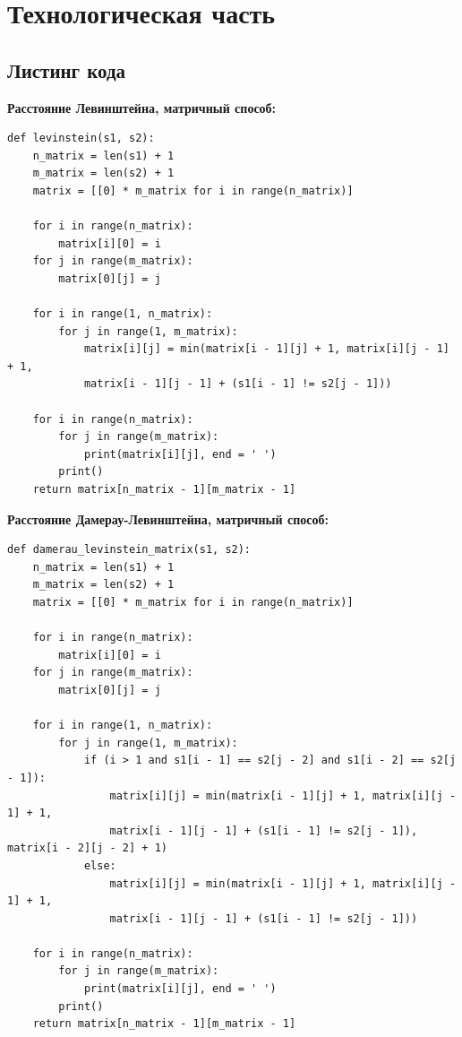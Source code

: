 \documentclass[a4paper,14pt]{report} %
\begin{document}
\chapter{Технологическая часть}
\section{Листинг кода}

\textbf{Расстояние Левинштейна, матричный способ: }
\begin{lstlisting}
def levinstein(s1, s2):
    n_matrix = len(s1) + 1
    m_matrix = len(s2) + 1
    matrix = [[0] * m_matrix for i in range(n_matrix)]

    for i in range(n_matrix):
        matrix[i][0] = i
    for j in range(m_matrix):
        matrix[0][j] = j

    for i in range(1, n_matrix):
        for j in range(1, m_matrix):
            matrix[i][j] = min(matrix[i - 1][j] + 1, matrix[i][j - 1] + 1,
            matrix[i - 1][j - 1] + (s1[i - 1] != s2[j - 1]))

    for i in range(n_matrix):
        for j in range(m_matrix):
            print(matrix[i][j], end = ' ')
        print()
    return matrix[n_matrix - 1][m_matrix - 1]
\end{lstlisting}

\textbf{Расстояние Дамерау-Левинштейна, матричный способ: }
\begin{lstlisting}
def damerau_levinstein_matrix(s1, s2):
    n_matrix = len(s1) + 1
    m_matrix = len(s2) + 1
    matrix = [[0] * m_matrix for i in range(n_matrix)]

    for i in range(n_matrix):
        matrix[i][0] = i
    for j in range(m_matrix):
        matrix[0][j] = j

    for i in range(1, n_matrix):
        for j in range(1, m_matrix):
            if (i > 1 and s1[i - 1] == s2[j - 2] and s1[i - 2] == s2[j - 1]):
                matrix[i][j] = min(matrix[i - 1][j] + 1, matrix[i][j - 1] + 1,
                matrix[i - 1][j - 1] + (s1[i - 1] != s2[j - 1]), matrix[i - 2][j - 2] + 1)
            else:
                matrix[i][j] = min(matrix[i - 1][j] + 1, matrix[i][j - 1] + 1,
                matrix[i - 1][j - 1] + (s1[i - 1] != s2[j - 1]))

    for i in range(n_matrix):
        for j in range(m_matrix):
            print(matrix[i][j], end = ' ')
        print()
    return matrix[n_matrix - 1][m_matrix - 1]
\end{lstlisting}
\end{document}
